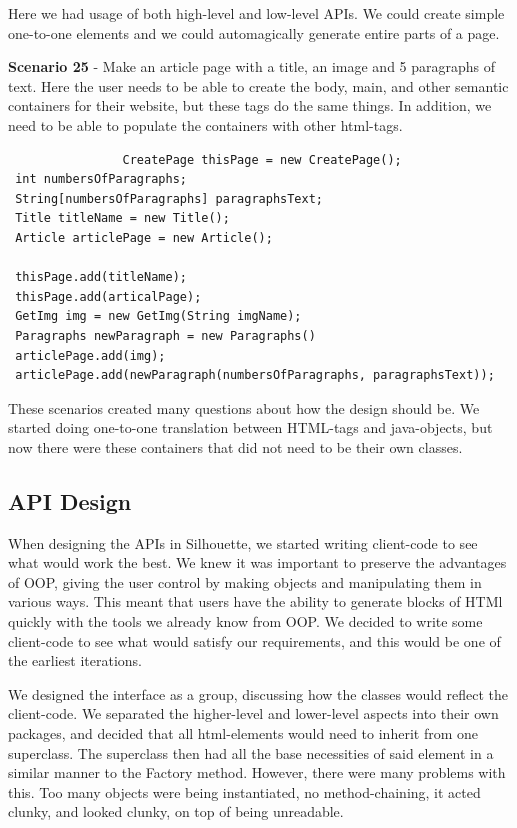 \documentclass[12pt]{article}
\begin{document}
        Here we had usage of both high-level and low-level APIs. We could create simple one-to-one elements and we could automagically generate entire parts of a page. 

        \textbf{Scenario 25} - Make an article page with a title, an image and 5 paragraphs of text.
        Here the user needs to be able to create the body, main, and other semantic containers for their website, but these tags do the same things. In addition, we need to be able to populate the containers with other html-tags.
        \begin{shaded}
            \begin{lstlisting}
                CreatePage thisPage = new CreatePage();
 int numbersOfParagraphs;
 String[numbersOfParagraphs] paragraphsText;
 Title titleName = new Title();
 Article articlePage = new Article();

 thisPage.add(titleName);
 thisPage.add(articalPage);
 GetImg img = new GetImg(String imgName);
 Paragraphs newParagraph = new Paragraphs()
 articlePage.add(img);
 articlePage.add(newParagraph(numbersOfParagraphs, paragraphsText));

            \end{lstlisting}
        \end{shaded}
        
        These scenarios created many questions about how the design should be. We started doing one-to-one translation between HTML-tags and java-objects, but now there were these containers that did not need to be their own classes.
        

    \subsection{API Design}

    When designing the APIs in Silhouette, we started writing client-code to see what would work the best. We knew it was important to preserve the advantages of OOP, giving the user control by making objects and manipulating them in various ways. This meant that users have the ability to generate blocks of HTMl quickly with the tools we already know from OOP. We decided to write some client-code to see what would satisfy our requirements, and this would be one of the earliest iterations.

    We designed the interface as a group, discussing how the classes would reflect the client-code. We separated the higher-level and lower-level aspects into their own packages, and decided that all html-elements would need to inherit from one superclass. The superclass then had all the base necessities of said element in a similar manner to the Factory method. However, there were many problems with this. Too many objects were being instantiated, no method-chaining, it acted clunky, and looked clunky, on top of being unreadable.
\end{document}
